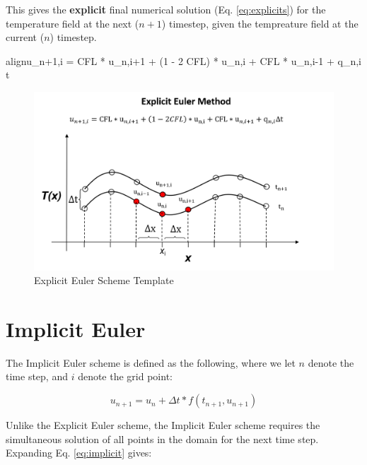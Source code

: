 \documentclass[10pt, letter, showtrims]{extarticle}
\newcommand{\boxedeq}[2]{\begin{empheq}[box={\fboxsep=6pt\fbox}]{align}\label{#1}#2\end{empheq}}
\begin{document}
		\noindent
		This gives the \textbf{explicit} final numerical solution (Eq. \ref{eq:explicits}) for the temperature field at the next ($n + 1$) timestep, given the tempreature field at the current ($n$) timestep.
		
		\boxedeq{eq:explicits}{u_{n+1,i} = CFL * u_{n,i+1} + (1 - 2 CFL) * u_{n,i} + CFL * u_{n,i-1} + q_{n,i} \Delta t}
		
		\FloatBarrier
		\begin{figure}[h]
			\centering
			\captionsetup{justification=centering}
			\includegraphics[width=0.75\linewidth]{"Figures/Explicit_Euler_Method"}
			\caption{Explicit Euler Scheme Template}
			\label{fig:explicit}
		\end{figure}
		\FloatBarrier
		
		\pagebreak
		
		\noindent
		\section{Implicit Euler}
		
		\noindent
		The Implicit Euler scheme is defined as the following, where we let $n$ denote the time step, and $i$ denote the grid point:
		
		\begin{equation}
		\label{eq:implicit}
			u_{n+1} = u_{n} + \Delta t * f(t_{n+1}, u_{n+1})
		\end{equation}
		
		\noindent
		Unlike the Explicit Euler scheme, the Implicit Euler scheme requires the simultaneous solution of all points in the domain for the next time step. \\
		
		\noindent
		Expanding Eq. \ref{eq:implicit} gives:
		
		
\end{document}
